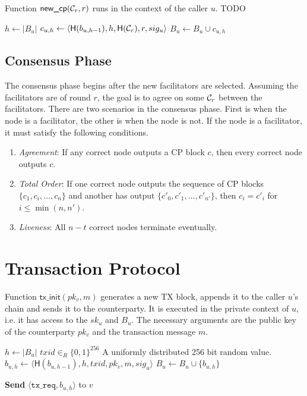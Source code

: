 \begin{algorithm}
\caption{Function $\textsf{new\_cp}(\mathcal{C}_r, r)$ runs in the context of the caller $u$. TODO}
\label{alg:new-cp}
\begin{algorithmic}
\State $h \gets |B_u|$
\State $c_{u, h} \gets \langle \textsf{H}(b_{u, h-1}), h, \textsf{H}(\mathcal{C}_r), r, sig_u \rangle$
\State $B_u \gets B_u \cup c_{u, h}$
\end{algorithmic}
\end{algorithm}

\subsection{Consensus Phase}
The consensus phase begins after the new facilitators are selected.
Assuming the facilitators are of round $r$,
the goal is to agree on some $\mathcal{C}_r$ between the facilitators.
There are two scenarios in the consensus phase.
First is when the node is a facilitator, the other is when the node is not.
If the node is a facilitator, it must satisfy the following conditions.
\begin{enumerate}
\item \emph{Agreement}: If any correct node outputs a CP block $c$, then every
  correct node outputs $c$.
\item \emph{Total Order}: If one correct node outputs the sequence of CP blocks
  $\{c_1, c_i, \dots, c_n\}$ and another has output $\{c'_0, c'_1, \dots,
  c'_{n'} \}$, then $c_i = c'_i$ for $i \le \min(n, n')$.
\item \emph{Liveness}: All $n - t$ correct nodes terminate eventually.
\end{enumerate}

\section{Transaction Protocol}
\label{sec:tx-protocol}

\begin{algorithm}

    \caption{Function $\textsf{tx\_init}(pk_v, m)$ generates a new TX block,
    appends it to the caller $u$'s chain and sends it to the counterparty.
    It is executed in the private context of $u$, i.e. it has access to the $sk_u$ and $B_u$.
    The necessary arguments are the public key of the counterparty $pk_v$ and the transaction message $m$.}
    \label{alg:tx-init}

    \begin{algorithmic}

    \State $h \gets |B_u|$
    \State $txid \in_R \{0, 1\}^{256}$ \Comment A uniformly distributed 256 bit random value.
    \State $b_{u, h} \gets \langle \textsf{H}(b_{u, h - 1}), h, txid, pk_v, m, sig_u \rangle$
    \State $B_u \gets B_u \cup \{ b_{u, h} \}$

    \State \textbf{Send} $\langle \texttt{tx\_req}, b_{u,h} \rangle$ to $v$

\end{algorithmic}
\end{algorithm}

